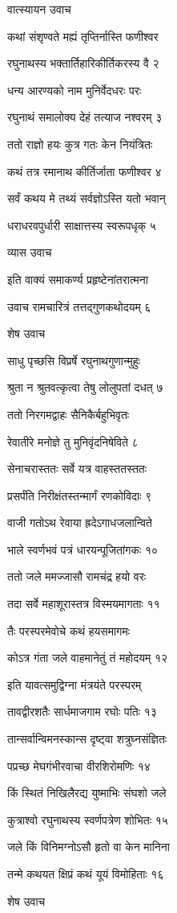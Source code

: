 वात्स्यायन उवाच

कथां संशृण्वते मह्यं तृप्तिर्नास्ति फणीश्वर

रघुनाथस्य भक्तार्तिहारिकीर्तिकरस्य वै २

धन्य आरण्यको नाम मुनिर्वेदधरः परः

रघुनाथं समालोक्य देहं तत्याज नश्वरम् ३

ततो राज्ञो हयः कुत्र गतः केन नियंत्रितः

कथं तत्र रमानाथ कीर्तिर्जाता फणीश्वर ४

सर्वं कथय मे तथ्यं सर्वज्ञोऽस्ति यतो भवान्

धराधरवपुर्धारी साक्षात्तस्य स्वरूपधृक् ५

व्यास उवाच

इति वाक्यं समाकर्ण्य प्रहृष्टेनांतरात्मना

उवाच रामचारित्रं तत्तद्गुणकथोदयम् ६

शेष उवाच

साधु पृच्छसि विप्रर्षे रघुनाथगुणान्मुहुः

श्रुता न श्रुतवत्कृत्वा तेषु लोलुपतां दधत् ७

ततो निरगमद्वाहः सैनिकैर्बहुभिवृतः

रेवातीरे मनोज्ञे तु मुनिवृंदनिषेविते ८

सेनाचरास्ततः सर्वे यत्र वाहस्ततस्ततः

प्रसर्पंति निरीक्षंतस्तन्मार्गं रणकोविदाः ९

वाजी गतोऽथ रेवाया ह्रदेऽगाधजलान्विते

भाले स्वर्णभवं पत्रं धारयन्पूजितांगकः १०

ततो जले ममज्जासौ रामचंद्र हयो वरः

तदा सर्वे महाशूरास्तत्र विस्मयमागताः ११

तैः परस्परमेवोचे कथं हयसमागमः

कोऽत्र गंता जले वाहमानेतुं तं महोदयम् १२

इति यावत्समुद्विग्ना मंत्रयंते परस्परम्

तावद्वीरशतैः सार्धमाजगाम रघोः पतिः १३

तान्सर्वान्विमनस्कान्स दृष्ट्वा शत्रुघ्नसंज्ञितः

पप्रच्छ मेघगंभीरवाचा वीरशिरोमणिः १४

किं स्थितं निखिलैरद्य युष्माभिः संघशो जले

कुत्राश्वो रघुनाथस्य स्वर्णपत्रेण शोभितः १५

जले किं विनिमग्नोऽसौ हृतो वा केन मानिना

तन्मे कथयत क्षिप्रं कथं यूयं विमोहिताः १६

शेष उवाच


